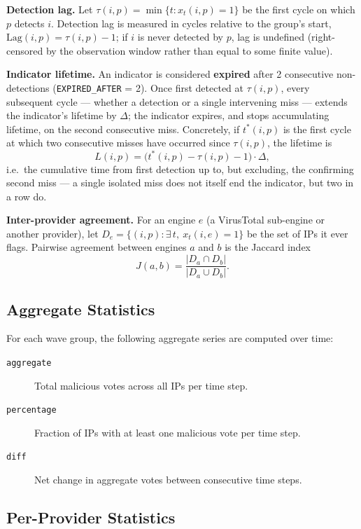 \documentclass[12pt, a4paper, twoside]{report}
\begin{document}
\textbf{Detection lag.} Let $\tau(i,p) = \min\{t : x_t(i,p) = 1\}$ be the first cycle on which $p$
detects $i$. Detection lag is measured in cycles relative to the group's start,
$\mathrm{Lag}(i,p) = \tau(i,p) - 1$; if $i$ is never detected by $p$, lag is undefined (right-censored
by the observation window rather than equal to some finite value).

\textbf{Indicator lifetime.} An indicator is considered \textbf{expired} after 2 consecutive
non-detections (\texttt{EXPIRED\_AFTER} = 2). Once first detected at $\tau(i,p)$, every subsequent
cycle --- whether a detection or a single intervening miss --- extends the indicator's lifetime by
$\Delta$; the indicator expires, and stops accumulating lifetime, on the second consecutive miss.
Concretely, if $t^*(i,p)$ is the first cycle at which two consecutive misses have occurred since
$\tau(i,p)$, the lifetime is
\[
  L(i,p) = \bigl(t^*(i,p) - \tau(i,p) - 1\bigr) \cdot \Delta ,
\]
i.e.\ the cumulative time from first detection up to, but excluding, the confirming second miss ---
a single isolated miss does not itself end the indicator, but two in a row do.

\textbf{Inter-provider agreement.} For an engine $e$ (a VirusTotal sub-engine or another provider),
let $D_e = \{(i,p) : \exists\, t,\ x_t(i,e)=1\}$ be the set of IPs it ever flags. Pairwise agreement
between engines $a$ and $b$ is the Jaccard index
\[
  J(a,b) = \frac{|D_a \cap D_b|}{|D_a \cup D_b|} .
\]

\subsection{Aggregate Statistics}

For each wave group, the following aggregate series are computed over time:
\begin{description}
  \item[\texttt{aggregate}] Total malicious votes across all IPs per time step.
  \item[\texttt{percentage}] Fraction of IPs with at least one malicious vote per time step.
  \item[\texttt{diff}] Net change in aggregate votes between consecutive time steps.
\end{description}

\subsection{Per-Provider Statistics}
\end{document}
